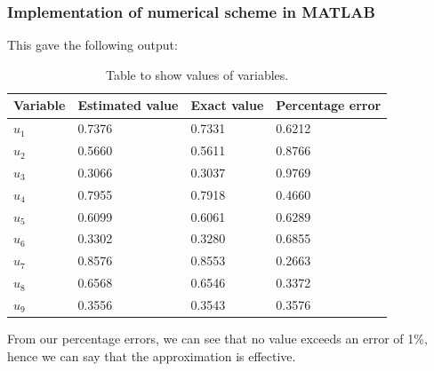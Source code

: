 \documentclass[11pt]{article}
\numberwithin{equation}{section}
\begin{document}
\subsubsection{Implementation of numerical scheme in MATLAB}

This gave the following output:
\begin{table}[H]
    \centering
    \begin{tabular}{llll}
        \toprule
        \textbf{Variable} & \textbf{Estimated value} & \textbf{Exact value} & \textbf{Percentage error}\\
        \midrule
        $u_1$ & 0.7376 & 0.7331 & 0.6212 \\
        $u_2$ & 0.5660 & 0.5611 & 0.8766 \\
        $u_3$ & 0.3066 & 0.3037 & 0.9769 \\
        $u_4$ & 0.7955 & 0.7918 & 0.4660 \\
        $u_5$ & 0.6099 & 0.6061 & 0.6289 \\
        $u_6$ & 0.3302 & 0.3280 & 0.6855 \\
        $u_7$ & 0.8576 & 0.8553 & 0.2663 \\
        $u_8$ & 0.6568 & 0.6546 & 0.3372 \\
        $u_9$ & 0.3556 & 0.3543 & 0.3576 \\ 
        \bottomrule
    \end{tabular}
    \caption{Table to show values of variables.}
\end{table}
From our percentage errors, we can see that no value exceeds an error of 1\%, hence we can say that the approximation is effective.
\end{document}
